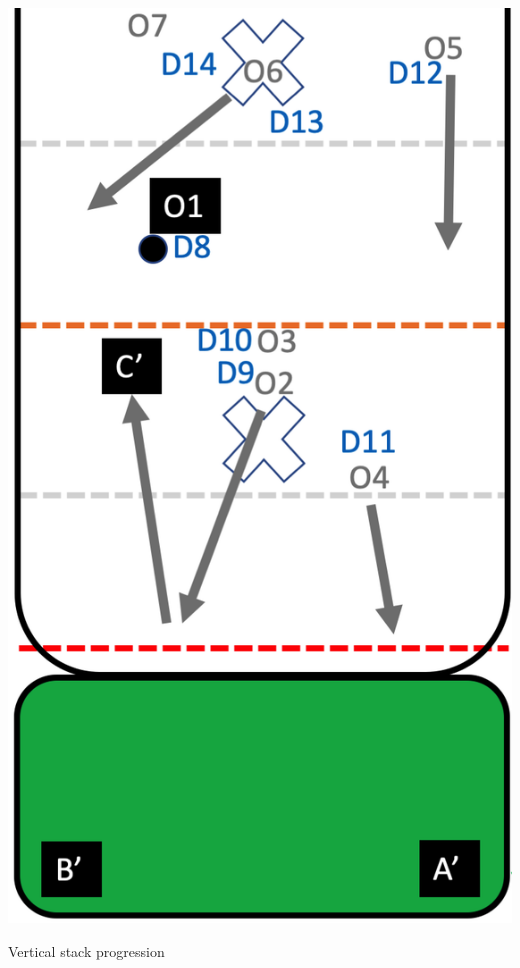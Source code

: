 \documentclass{tufte-handout}
\begin{document}
\begin{marginfigure}%
  \includegraphics[width=\linewidth]{O1-vertical2}
  \caption{Vertical stack progression}
  \label{fig:O1-vertical2}
\end{marginfigure}
\end{document}
